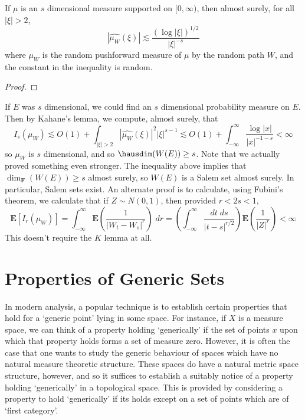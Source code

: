 \begin{lemma}
	If $\mu$ is an $s$ dimensional measure supported on $[0,\infty)$, then almost surely, for all $|\xi| > 2$,
	\[ |\widehat{\mu_W}(\xi)| \lesssim \frac{(\log |\xi|)^{1/2}}{|\xi|^{-s}} \]
	where $\mu_W$ is the random pushforward measure of $\mu$ by the random path $W$, and the constant in the inequality is random.
\end{lemma}
\begin{proof}
	
\end{proof}

If $E$ was $s$ dimensional, we could find an $s$ dimensional probability measure on $E$. Then by Kahane's lemma, we compute, almost surely, that
%
\[ I_s(\mu_W) \lesssim O(1) + \int_{|\xi| > 2} |\widehat{\mu_W}(\xi)|^2 |\xi|^{s-1} \lesssim O(1) + \int_{-\infty}^\infty \frac{\log |x|}{|x|^{-1-s}} < \infty \]
%
so $\mu_W$ is $s$ dimensional, and so $\hausdim(W(E)) \geq s$. Note that we actually proved something even stronger. The inequality above implies that $\dim_{\mathbf{F}}(W(E)) \geq s$ almost surely, so $W(E)$ is a Salem set almost surely. In particular, Salem sets exist. An alternate proof is to calculate, using Fubini's theorem, we calculate that if $Z \sim N(0,1)$, then provided $r < 2s < 1$,
	\[ \mathbf{E}[I_r(\mu_W)] = \int_{-\infty}^\infty \mathbf{E} \left( \frac{1}{|W_t - W_s|^r} \right)\; dr = \left( \int_{-\infty}^\infty \frac{dt\; ds}{|t-s|^{r/2}} \right) \mathbf{E} \left( \frac{1}{|Z|^r} \right) < \infty \]
	This doesn't require the $K$ lemma at all.

\chapter{Properties of Generic Sets}

In modern analysis, a popular technique is to establish certain properties that hold for a `generic point' lying in some space. For instance, if $X$ is a measure space, we can think of a property holding `generically' if the set of points $x$ upon which that property holds forms a set of measure zero. However, it is often the case that one wants to study the generic behaviour of spaces which have no natural measure theoretic structure. These spaces do have a natural metric space structure, however, and so it suffices to establish a suitably notice of a property holding `generically' in a topological space. This is provided by considering a property to hold `generically' if its holds except on a set of points which are of `first category'.

